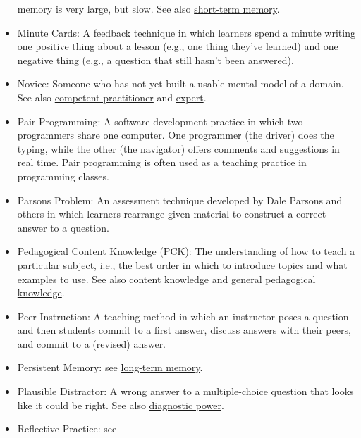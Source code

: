 \documentclass[10pt,statementpaper]{memoir}
\begin{document}
\begin{itemize}
  memory is very large, but slow. See also
  \href{gloss.html\#short-term-memory}{short-term memory}.
\item
  \protect\hypertarget{minute-cards}{}{Minute Cards}: A feedback
  technique in which learners spend a minute writing one positive thing
  about a lesson (e.g., one thing they've learned) and one negative
  thing (e.g., a question that still hasn't been answered).
\item
  \protect\hypertarget{novice}{}{Novice}: Someone who has not yet built
  a usable mental model of a domain. See also
  \href{gloss.html\#competent-practitioner}{competent practitioner} and
  \href{gloss.html\#expert}{expert}.
\item
  \protect\hypertarget{pair-programming}{}{Pair Programming}: A software
  development practice in which two programmers share one computer. One
  programmer (the driver) does the typing, while the other (the
  navigator) offers comments and suggestions in real time. Pair
  programming is often used as a teaching practice in programming
  classes.
\item
  \protect\hypertarget{parsons-problem}{}{Parsons Problem}: An
  assessment technique developed by Dale Parsons and others in which
  learners rearrange given material to construct a correct answer to a
  question.
\item
  \protect\hypertarget{pedagogical-content-knowledge}{}{Pedagogical
  Content Knowledge} (PCK): The understanding of how to teach a
  particular subject, i.e., the best order in which to introduce topics
  and what examples to use. See also
  \href{gloss.html\#content-knowledge}{content knowledge} and
  \href{gloss.html\#general-pedagogical-knowledge}{general pedagogical
  knowledge}.
\item
  \protect\hypertarget{peer-instruction}{}{Peer Instruction}: A teaching
  method in which an instructor poses a question and then students
  commit to a first answer, discuss answers with their peers, and commit
  to a (revised) answer.
\item
  \protect\hypertarget{persistent-memory}{}{Persistent Memory}: see
  \href{gloss.html\#long-term-memory}{long-term memory}.
\item
  \protect\hypertarget{plausible-distractor}{}{Plausible Distractor}: A
  wrong answer to a multiple-choice question that looks like it could be
  right. See also \href{gloss.html\#diagnostic-power}{diagnostic power}.
\item
  \protect\hypertarget{reflective-practice}{}{Reflective Practice}: see

\end{itemize}
\end{document}
